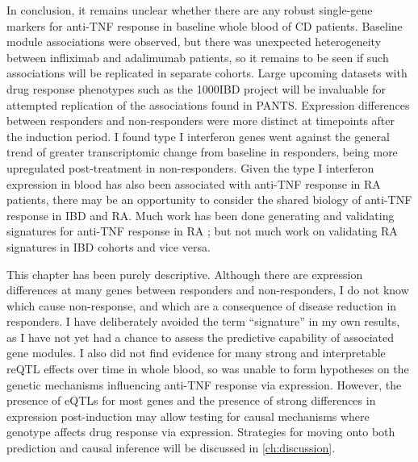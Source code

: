 In conclusion,
it remains unclear whether there are any robust single-gene markers for anti-\gls{TNF} response in baseline whole blood of \gls{CD} patients.
Baseline module associations were observed, but there was unexpected heterogeneity between infliximab and adalimumab patients,
so it remains to be seen if such associations will be replicated in separate cohorts.
Large upcoming datasets with drug response phenotypes such as the 1000IBD project \autocite{imhann20191000IBDProjectMultiomics} will be invaluable for attempted replication of the associations found in \gls{PANTS}.
Expression differences between responders and non-responders were more distinct at timepoints after the induction period.
I found type I interferon genes went against the general trend of greater transcriptomic change from baseline in responders,
being more upregulated post-treatment in non-responders.
Given the type I interferon expression in blood has also been associated with anti-\gls{TNF} response in \gls{RA} patients,
there may be an opportunity to consider the shared biology of anti-\gls{TNF} response in \gls{IBD} and \gls{RA}.
Much work has been done generating and validating signatures for anti-\gls{TNF} response in \gls{RA} \autocite{toonen2012ValidationStudyExisting}; but not much work on validating \gls{RA} signatures in \gls{IBD} cohorts and vice versa.

This chapter has been purely descriptive.
Although there are expression differences at many genes between responders and non-responders,
I do not know which cause non-response,
and which are a consequence of disease reduction in responders.
I have deliberately avoided the term \enquote{signature} in my own results, 
as I have not yet had a chance to assess the predictive capability of associated gene modules.
I also did not find evidence for many strong and interpretable \gls{reQTL} effects over time in whole blood, 
so was unable to form hypotheses on the genetic mechanisms influencing anti-\gls{TNF} response via expression.
However, the presence of \glspl{eQTL} for most genes and the presence of strong differences in expression post-induction may allow testing for causal mechanisms where genotype affects drug response via expression.
Strategies for moving onto both prediction and causal inference will be discussed in \cref{ch:discussion}.

